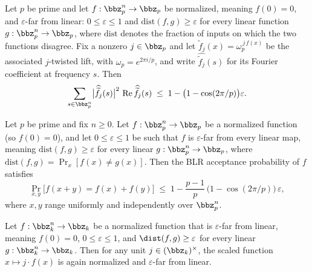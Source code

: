\begin{lemma}
\label{ZkBLR.weighted_sum_lift_omega_j_bound}
\leanok
{}
Let $p$ be prime and let $f : \bbz_p^n \to \bbz_p$ be normalized, meaning $f(0) = 0$,
and $\varepsilon$-far from linear: $0 \le \varepsilon \le 1$ and $\mathrm{dist}(f,g) \ge
\varepsilon$ for every linear function $g : \bbz_p^n \to \bbz_p$, where $\mathrm{dist}$
denotes the fraction of inputs on which the two functions disagree. Fix a nonzero $j \in
\bbz_p$ and let $\widetilde{f}_j(x) = \omega_p^{\,j\, f(x)}$ be the associated
$j$-twisted lift, with $\omega_p = e^{2\pi i / p}$, and write
$\widehat{\widetilde{f}_j}(s)$ for its Fourier coefficient at frequency $s$. Then
\[
\sum_{s \in \bbz_p^n} \bigl|\widehat{\widetilde{f}_j}(s)\bigr|^2
\,\operatorname{Re}\widehat{\widetilde{f}_j}(s)
  \;\le\; 1 - \bigl(1 - \cos(2\pi/p)\bigr)\varepsilon .
\]
\end{lemma}

\begin{lemma}
\label{ZkBLR.BLR_soundness}
\leanok
{}
Let $p$ be prime and fix $n \ge 0$. Let $f : \bbz_p^n \to \bbz_p$ be a normalized
function (so $f(0)=0$), and let $0 \le \varepsilon \le 1$ be such that $f$ is
$\varepsilon$-far from every linear map, meaning $\mathrm{dist}(f,g) \ge \varepsilon$
for every linear $g : \bbz_p^n \to \bbz_p$, where $\mathrm{dist}(f,g) = \Pr_x[f(x) \ne
g(x)]$. Then the BLR acceptance probability of $f$ satisfies
\[
  \Pr_{x,y}\bigl[f(x+y) = f(x)+f(y)\bigr]
  \;\le\; 1 - \frac{p-1}{p}\,\bigl(1 - \cos(2\pi/p)\bigr)\,\varepsilon,
\]
where $x,y$ range uniformly and independently over $\bbz_p^n$.
\end{lemma}

\begin{lemma}
\label{ZkBLR.unit_mul_epsilon_far}
\leanok
{}
Let $f : \bbz_k^n \to \bbz_k$ be a normalized function that is $\varepsilon$-far from
linear, meaning $f(0) = 0$, $0 \le \varepsilon \le 1$, and $\dist(f, g) \ge \varepsilon$
for every linear $g : \bbz_k^n \to \bbz_k$. Then for any unit $j \in (\bbz_k)^\times$,
the scaled function $x \mapsto j \cdot f(x)$ is again normalized and $\varepsilon$-far
from linear.
\end{lemma}

